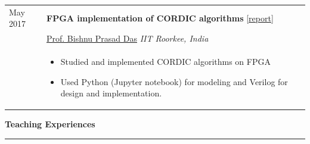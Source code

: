 \documentclass{article}
\newlength{\workexitemsep}
\newlength{\workexitemsep}
\newcommand{\sectiontitle}[1]{
  \textbf{\Large{\sffamily #1}}
  \begin{center}
    \vspace{-0.55cm} 
    \rule{0.945\textwidth}{1.1pt} 
  \end{center}
  \vspace{-0.1cm} 
}
\begin{document}
    \ifdefined\cv
        \vspace{-0.2cm}
    \fi
    \ifdefined\resume
        \vspace{-0.4cm}
    \fi
    
    \begin{tabular}{p{} p{}}
        \centering May 2017       & \textbf{FPGA implementation of CORDIC algorithms} [\href{http://suyashmahar.com/resources/project-report-summer-2017.pdf}{report}] \\
        \centering              & \href{http://faculty.iitr.ac.in/~bpdasfec/}{Prof. Bishnu Prasad Das} \hfill \textit{IIT Roorkee, India}\\ 
        \centering               & \vspace{-0.6cm}\begin{itemize}[itemsep=\workexitemsep]
        \item Studied and implemented CORDIC algorithms on FPGA
        \item Used Python (Jupyter notebook) for modeling and Verilog for design and implementation.
    \end{itemize}
    \end{tabular}
    
    \ifdefined\cv
        \vspace{-0.2cm}
    \fi
    \ifdefined\resume
        \vspace{-0.4cm}
    \fi
    
    \ifdefined{} \fi
    
    \sectiontitle{Teaching Experiences}
    
\end{document}
